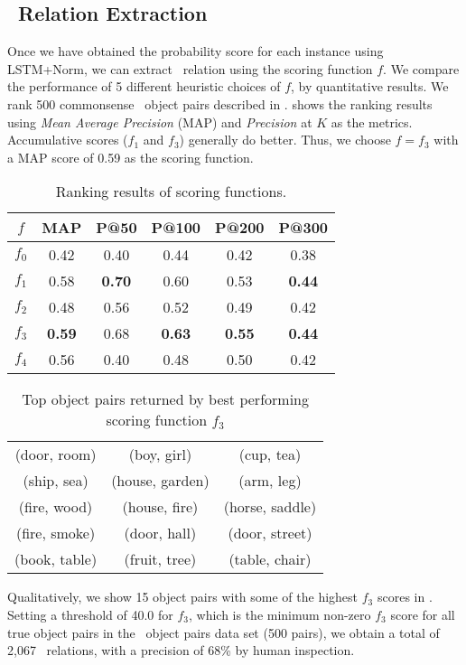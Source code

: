 \subsection{\lnear\ Relation Extraction}
Once we have obtained the probability score for each instance using LSTM+Norm, we can extract \lnear\
relation using the scoring function $f$. 
We compare the performance of 5 different heuristic choices of $f$, by quantitative results. 
We rank 500 commonsense \lnear\ object pairs described in \secref{sec:mine}. \tabref{tab:3m} shows the ranking results using
\textit{Mean Average Precision} (MAP) and \textit{Precision} at $K$ as the metrics. 
Accumulative scores ($f_1$ and $f_3$) generally do better. 
Thus, we choose $f = f_3$ with a MAP score of 0.59 as the scoring function.
\begin{table}[t]
	\centering
	\small
	\begin{tabular}{|cccccc|}
		\hline
		${f}$	& {MAP} & {P@50} & {P@100}  &  {P@200}& {P@300}\\ \hline \hline
		$f_0$ & 0.42 & 0.40 & 0.44 & 0.42 & 0.38 \\ \hline
		$f_1$	& 0.58  & {\bf 0.70} & 0.60& 0.53 & {\bf 0.44}\\\hline
		$f_2$	& 0.48 & 0.56 & 0.52  & 0.49 & 0.42\\\hline
		$f_3$	& {\bf 0.59} & 0.68& {\bf 0.63} & {\bf 0.55} & {\bf 0.44}\\\hline
		$f_4$	& 0.56 & 0.40 & 0.48 & 0.50 & 0.42\\\hline
	\end{tabular}
	\caption{Ranking results of scoring functions.}
	\label{tab:3m}
\end{table} 


\begin{table}[th]
	\centering
	\small
	\begin{tabular}{|ccc|}
		\hline
		(door, room)  & (boy, girl)     & (cup, tea)      \\
		(ship, sea)   & (house, garden) & (arm, leg)      \\
		(fire, wood)  & (house, fire)   & (horse, saddle) \\
		(fire, smoke) & (door, hall)    & (door, street)  \\
		(book, table) & (fruit, tree)   & (table, chair)  \\ \hline
	\end{tabular}
	\caption{Top object pairs returned by best performing scoring function $f_3$}
	\label{tbl:toppairs}
\end{table} 

Qualitatively, we show 15 object pairs with some of the highest $f_3$ scores
in \tabref{tbl:toppairs}.
Setting a threshold of 40.0 for $f_3$, which is the minimum non-zero
$f_3$ score for all true object pairs in the \lnear\ object pairs 
data set (500 pairs), we obtain a total of 2,067 \lnear\ relations, with
a precision of 68\% by human inspection.

